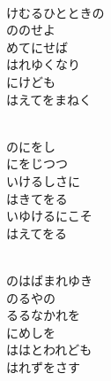 \documentclass[10pt,b5j]{tarticle} %
\begin{document}
\begin{enumerate} %
    \setlength{\itemindent}{\itemmargin}
    \begin{minipage}[c]{\blocksize}
        
        \vspace{\linespace}
        \item~\\
        けむるひとときの\\
        ののせよ\\
        めてにせば\\
        はれゆくなり\\
        にけども\\
        はえてをまねく
        
    \end{minipage}
    \begin{minipage}[c]{\blocksize}
        
        \vspace{\linespace}
        \item~\\
        のにをし\\
        にをじつつ\\
        いけるしさに\\
        はきてをる\\
        いゆけるにこそ\\
        はえてをる
        
    \end{minipage}
    \begin{minipage}[c]{\blocksize}

        \vspace{\linespace}
        \item~\\
        のはばまれゆき\\
        のるやの\\
        るるなかれを\\
        にめしを\\
        ははとわれども\\
        はれずをさす
    
    \end{minipage}
\end{enumerate} %
\end{document}
